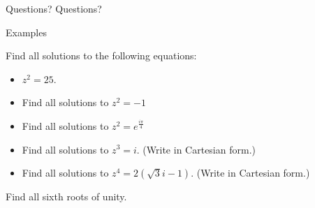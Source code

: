 \documentclass{beamer}
\begin{document}
\begin{frame}{Questions?}
Questions?
\end{frame}

\begin{frame}{Examples}
\begin{example}
Find all solutions to the following equations:
\begin{itemize}
	\item $z^2 = 25$. %
	\item Find all solutions to $z^2 = -1$ %
	\item Find all solutions to $z^2 = e^{\frac{i\pi}{4}}$ %
	\item Find all solutions to $z^3 = i$. (Write in Cartesian form.) %
	\item Find all solutions to $z^4 = 2(\sqrt{3}i-1)$. (Write in Cartesian form.) %
\end{itemize}
\end{example}
\begin{example}
Find all sixth roots of unity.
\end{example}
\end{frame}
\end{document}

